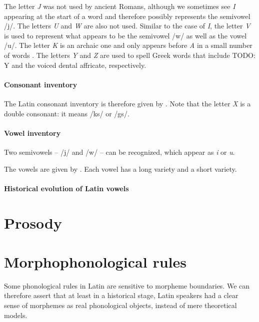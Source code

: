 \documentclass[a4paper, oneside, 12pt]{report}
\newcommand*{\citechap}[1]{chap.~{#1}}
\newcommand*{\citetable}[1]{Table~{#1}}
\newcommand{\form}[1]{\emph{#1}}
\begin{document}
The letter \form{J} was not used by ancient Romans, 
although we sometimes see \form{I} appearing at the start of a word 
and therefore possibly represents the semivowel /j/.
The letters \form{U} and \form{W} are also not used.
Similar to the case of \form{I},
the letter \form{V} is used to represent 
what appears to be the semivowel /w/ 
as well as the vowel /u/. 
The letter \form{K} is an archaic one 
and only appears before \form{A} in a small number of words
\citep[\citechap{2}]{oniga2014latin}.
The letters \form{Y} and \form{Z} are used to spell Greek words that 
include TODO: Y and the voiced dental affricate, respectively.

\paragraph*{Consonant inventory}
The Latin consonant inventory is therefore given by \citet[\citetable{3.1}]{oniga2014latin}.
Note that the letter \form{X} is a double consonant: 
it means /ks/ or /gs/.

\paragraph*{Vowel inventory}
Two semivowels -- /j/ and /w/ -- can be recognized,
which appear as \form{i} or \form{u}.

The vowels are given by \citet[\citetable{3.2}]{oniga2014latin}.
Each vowel has a long variety and a short variety.

\paragraph*{Historical evolution of Latin vowels}


\section{Prosody}



\section{Morphophonological rules}\label{sec:phonology.morphological}

Some phonological rules in Latin are sensitive to morpheme boundaries.
We can therefore assert that at least in a historical stage, 
Latin speakers had a clear sense of morphemes 
as real phonological objects,
instead of mere theoretical models.
\end{document}
